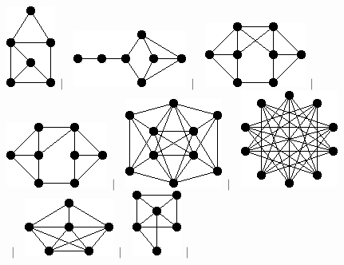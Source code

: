 \documentclass[11pt,paper=b5,footinclude,headinclude]{scrbook} %
\newtheorem{ex}{Vaja\hypertarget{sol:\theex}}[chapter]
\begin{document}
\begin{ex}
\begin{figure}
\includegraphics[scale=0.5]{smallGraphs/g_co-X18.png}$\,\mid\,$\
\includegraphics[scale=0.5]{smallGraphs/g_co-X184.png}$\,\mid\,$\
\includegraphics[scale=0.5]{smallGraphs/g_co-X191.png}$\,\mid\,$\
\includegraphics[scale=0.5]{smallGraphs/g_co-X192.png}$\,\mid\,$\
\includegraphics[scale=0.5]{smallGraphs/g_co-X194.png}$\,\mid\,$\
\includegraphics[scale=0.5]{smallGraphs/g_co-X195.png}$\,\mid\,$\
\includegraphics[scale=0.5]{smallGraphs/g_co-X197.png}$\,\mid\,$\
\includegraphics[scale=0.5]{smallGraphs/g_co-X198.png}$\,\mid\,$\

\end{figure}
\end{ex}
\end{document}

